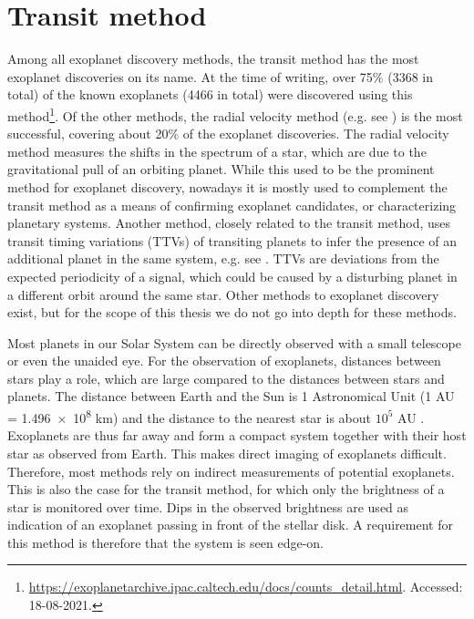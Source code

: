 
\section{Transit method}
\label{sec:transit}


Among all exoplanet discovery methods, the transit method has the most exoplanet discoveries on its name. At the time of writing, over 75\% (3368 in total) of the known exoplanets (4466 in total) were discovered using this method\footnote{\url{https://exoplanetarchive.ipac.caltech.edu/docs/counts_detail.html}. Accessed: 18-08-2021.}. Of the other methods, the radial velocity method (e.g. see \citealp{mayor1995jupiter}) is the most successful, covering about 20\% of the exoplanet discoveries. The radial velocity method measures the shifts in the spectrum of a star, which are due to the gravitational pull of an orbiting planet. While this used to be the prominent method for exoplanet discovery, nowadays it is mostly used to complement the transit method as a means of confirming exoplanet candidates, or characterizing planetary systems. Another method, closely related to the transit method, uses transit timing variations (TTVs) of transiting planets to infer the presence of an additional planet in the same system, e.g. see \cite{ballard2011kepler}. TTVs are deviations from the expected periodicity of a signal, which could be caused by a disturbing planet in a different orbit around the same star. Other methods to exoplanet discovery exist, but for the scope of this thesis we do not go into depth for these methods.

Most planets in our Solar System can be directly observed with a small telescope or even the unaided eye. For the observation of exoplanets, distances between stars play a role, which are large compared to the distances between stars and planets. The distance between Earth and the Sun is 1 Astronomical Unit (1 AU = \num{1.496e8} km) and the distance to the nearest star is about $10^5$ AU \citep{brown2021gaia}. Exoplanets are thus far away and form a compact system together with their host star as observed from Earth. This makes direct imaging of exoplanets difficult. Therefore, most methods rely on indirect measurements of potential exoplanets. This is also the case for the transit method, for which only the brightness of a star is monitored over time. Dips in the observed brightness are used as indication of an exoplanet passing in front of the stellar disk. A requirement for this method is therefore that the system is seen edge-on. 

